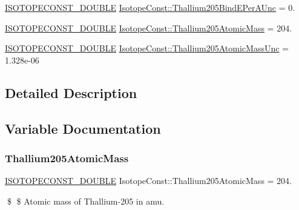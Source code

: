 \begin{DoxyCompactItemize}
\mbox{\hyperlink{group___isotope_const-_macros_ga8f45a7272ce02c0b4c65c44636ed719a}{I\+S\+O\+T\+O\+P\+E\+C\+O\+N\+S\+T\+\_\+\+D\+O\+U\+B\+LE}} \mbox{\hyperlink{group___isotope_const-_thallium-_tl205_gaa4b04664c5d84b692dda8c0ae2c332a9}{Isotope\+Const\+::\+Thallium205\+Bind\+E\+Per\+A\+Unc}} = 0.
\item 
\mbox{\hyperlink{group___isotope_const-_macros_ga8f45a7272ce02c0b4c65c44636ed719a}{I\+S\+O\+T\+O\+P\+E\+C\+O\+N\+S\+T\+\_\+\+D\+O\+U\+B\+LE}} \mbox{\hyperlink{group___isotope_const-_thallium-_tl205_ga3221393506d43bf27d8fb6f87889a5c6}{Isotope\+Const\+::\+Thallium205\+Atomic\+Mass}} = 204.
\item 
\mbox{\hyperlink{group___isotope_const-_macros_ga8f45a7272ce02c0b4c65c44636ed719a}{I\+S\+O\+T\+O\+P\+E\+C\+O\+N\+S\+T\+\_\+\+D\+O\+U\+B\+LE}} \mbox{\hyperlink{group___isotope_const-_thallium-_tl205_ga6e020e3ba97b6c9bfb9081c07da309e9}{Isotope\+Const\+::\+Thallium205\+Atomic\+Mass\+Unc}} = 1.\+328e-\/06
\end{DoxyCompactItemize}


\subsection{Detailed Description}


\subsection{Variable Documentation}
\mbox{\label{group___isotope_const-_thallium-_tl205_ga3221393506d43bf27d8fb6f87889a5c6}} 
\subsubsection{\texorpdfstring{Thallium205\+Atomic\+Mass}{Thallium205AtomicMass}}
{\footnotesize\ttfamily \mbox{\hyperlink{group___isotope_const-_macros_ga8f45a7272ce02c0b4c65c44636ed719a}{I\+S\+O\+T\+O\+P\+E\+C\+O\+N\+S\+T\+\_\+\+D\+O\+U\+B\+LE}} Isotope\+Const\+::\+Thallium205\+Atomic\+Mass = 204.}

\$ \$ Atomic mass of Thallium-\/205 in amu. \mbox{\label{group___isotope_const-_thallium-_tl205_ga6e020e3ba97b6c9bfb9081c07da309e9}} 
